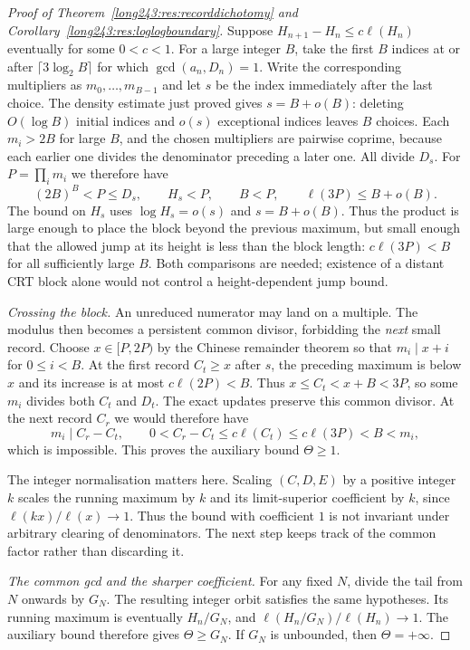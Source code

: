 \documentclass[11pt]{article}
\begin{document}
\begin{proof}[Proof of Theorem~\ref{long243:res:recorddichotomy} and
Corollary~\ref{long243:res:loglogboundary}]
Suppose $H_{n+1}-H_n\le c\ell(H_n)$ eventually for some $0<c<1$.
For a large integer $B$, take the first $B$ indices at or after
$\lceil3\log_2B\rceil$ for which $\gcd(a_n,D_n)=1$.
Write the corresponding multipliers as $m_0,\ldots,m_{B-1}$ and let
$s$ be the index immediately after the last choice. The density estimate
just proved gives $s=B+o(B)$: deleting $O(\log B)$ initial indices and
$o(s)$ exceptional indices leaves $B$ choices.
Each $m_i>2B$ for large $B$, and the chosen multipliers are pairwise
coprime, because each earlier one divides the denominator preceding a
later one. All divide $D_s$. For $P=\prod_i m_i$ we therefore have
\[
 (2B)^B<P\le D_s,\qquad H_s<P,\qquad B<P,
 \qquad \ell(3P)\le B+o(B).
\]
The bound on $H_s$ uses $\log H_s=o(s)$ and $s=B+o(B)$.
Thus the product is large enough to place the block beyond the previous
maximum, but small enough that the allowed jump at its height is less
than the block length: $c\ell(3P)<B$ for all sufficiently large $B$.
Both comparisons are needed; existence of a distant CRT block alone
would not control a height-dependent jump bound.

\emph{Crossing the block.}
An unreduced numerator may land on a multiple. The modulus then
becomes a persistent common divisor, forbidding the \emph{next}
small record. Choose $x\in[P,2P)$ by the Chinese remainder theorem so that
$m_i\mid x+i$ for $0\le i<B$. At the first record $C_t\ge x$
after $s$, the preceding maximum is below $x$ and its increase is
at most $c\ell(2P)<B$. Thus
$x\le C_t<x+B<3P$, so some $m_i$ divides both $C_t$ and $D_t$.
The exact updates preserve this common divisor. At the next record
$C_r$ we would therefore have
\[
 m_i\mid C_r-C_t,\qquad
 0<C_r-C_t\le c\ell(C_t)\le c\ell(3P)<B<m_i,
\]
which is impossible. This proves the auxiliary bound $\Theta\ge1$.

The integer normalisation matters here. Scaling $(C,D,E)$ by a positive
integer $k$ scales the running maximum by $k$ and its limit-superior
coefficient by $k$, since $\ell(kx)/\ell(x)\to1$. Thus the bound with
coefficient $1$ is not invariant under arbitrary clearing of denominators.
The next step keeps track of the common factor rather than discarding it.

\emph{The common gcd and the sharper coefficient.}
For any fixed $N$, divide the tail from $N$ onwards by $G_N$.
The resulting integer orbit satisfies the same hypotheses. Its running
maximum is eventually $H_n/G_N$, and
$\ell(H_n/G_N)/\ell(H_n)\to1$. The auxiliary bound therefore gives
$\Theta\ge G_N$. If $G_N$ is unbounded, then $\Theta=+\infty$.


\end{proof}
\end{document}
